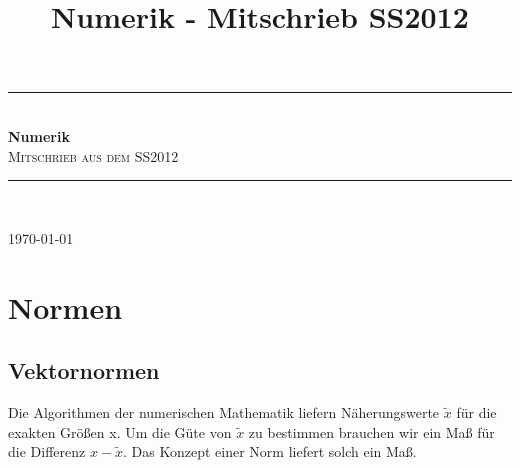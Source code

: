 \documentclass[a4paper,10pt]{article}
\title{Numerik - Mitschrieb SS2012}
\newtheorem[L]{satz}{Satz}[section]
\newtheorem[S]{beweis}{Beweis}
\newtheorem[S]{beh}{Behauptung}
\begin{document}
  \begin{titlepage}
    \thispagestyle{empty}

    \newcommand{\HRule}{\rule{\linewidth}{0.5mm}}

    \begin{center}
      \HRule \\[0.4cm]
      { \huge \bfseries Numerik}\\[0.5cm]
      \textsc{\LARGE Mitschrieb aus dem SS2012}\\
      \HRule \\[0.5cm]

      \vfill


      \vfill

      {\large \today}

    \end{center}
  \end{titlepage}
\newpage
  \thispagestyle{empty}
  \qquad
\newpage

\tableofcontents\thispagestyle{empty}
\newpage

\section{Normen}
\subsection{Vektornormen}
Die Algorithmen der numerischen Mathematik liefern Näherungswerte $\tilde{x}$ für die exakten Größen x.
Um die Güte von $\tilde{x}$ zu bestimmen brauchen wir ein Maß für die Differenz $x - \tilde{x}$.
Das Konzept einer Norm liefert solch ein Maß.

\smallskip
\end{document}
